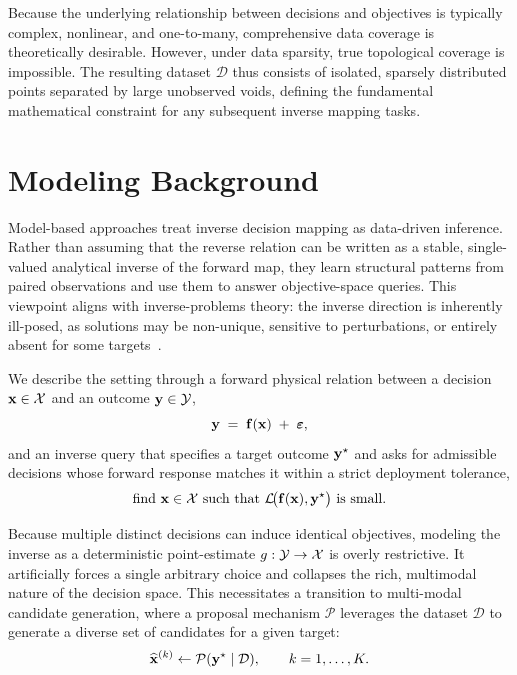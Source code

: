 Because the underlying relationship between decisions and objectives is typically complex, nonlinear, and one-to-many, comprehensive data coverage is theoretically desirable. However, under data sparsity, true topological coverage is impossible. The resulting dataset \(\mathcal{D}\) thus consists of isolated, sparsely distributed points separated by large unobserved voids, defining the fundamental mathematical constraint for any subsequent inverse mapping tasks.



\section{Modeling Background}\label{sec:modelling_background}

Model-based approaches treat inverse decision mapping as data-driven inference. Rather than assuming that the reverse relation can be written as a stable, single-valued analytical inverse of the forward map, they learn structural patterns from paired observations and use them to answer objective-space queries. This viewpoint aligns with inverse-problems theory: the inverse direction is inherently ill-posed, as solutions may be non-unique, sensitive to perturbations, or entirely absent for some targets~\cite{Stuart2010,Ongie2020}. 

We describe the setting through a forward physical relation between a decision $\mathbf{x}\in\mathcal{X}$ and an outcome $\mathbf{y}\in\mathcal{Y}$,
\begin{equation}
  \mathbf{y} \;=\; \mathbf{f}(\mathbf{x}) \;+\; \boldsymbol{\varepsilon},
  \label{eq:forward}
\end{equation}
and an inverse query that specifies a target outcome $\mathbf{y}^\star$ and asks for admissible decisions whose forward response matches it within a strict deployment tolerance,
\begin{equation}
  \text{find }\mathbf{x}\in\mathcal{X} \text{ such that } \mathcal{L}\!\big(\mathbf{f}(\mathbf{x}),\mathbf{y}^\star\big)\ \text{is small}.
  \label{eq:inverse_query}
\end{equation}

Because multiple distinct decisions can induce identical objectives, modeling the inverse as a deterministic point-estimate $g:\mathcal{Y}\to\mathcal{X}$ is overly restrictive. It artificially forces a single arbitrary choice and collapses the rich, multimodal nature of the decision space. This necessitates a transition to multi-modal candidate generation, where a proposal mechanism $\mathcal{P}$ leverages the dataset $\mathcal{D}$ to generate a diverse set of candidates for a given target:
\begin{equation}
  \widehat{\mathbf{x}}^{(k)} \gets \mathcal{P}(\mathbf{y}^\star \mid \mathcal{D}),\qquad k=1,\dots,K.
  \label{eq:candidate_proposal}
\end{equation}

